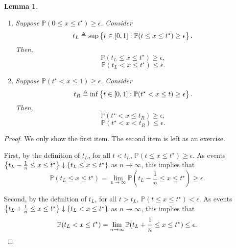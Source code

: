 \documentclass{article}
\newtheorem{lemma}{Lemma}
\newcommand{\PP}{\mathbb{P}}
\newcommand{\defeq}{\triangleq}
\begin{document}
\begin{lemma}
\begin{enumerate}
\item Suppose $\PP(0 \leq x \leq t^\star) \geq \epsilon$. Consider
\[ t_L \defeq \sup\cbr{t \in [0,1]: \PP(t \leq x \leq t^\star) \geq \epsilon}. \]
Then,
\[ \PP(t_L \leq x \leq t^\star) \geq \epsilon, \]
\[ \PP(t_L < x \leq t^\star) \leq \epsilon. \]

\item Suppose $\PP(t^\star < x \leq 1) \geq \epsilon$.
Consider
\[ t_R \defeq \inf\cbr{t \in [0,1]: \PP(t^\star < x \leq t) \geq \epsilon}. \]
Then,
\[ \PP(t^\star < x \leq t_R) \geq \epsilon, \]
\[ \PP(t^\star < x < t_R) \leq \epsilon. \]
\end{enumerate}
\label{lem:discont}
\end{lemma}
\begin{proof}
We only show the first item. The second item is left as an exercise.

First, by the definition of $t_L$, for all $t < t_L$,
$\PP(t \leq x \leq t^\star) \geq \epsilon$. As events
$\cbr{t_L - \frac{1}{n} \leq x \leq t^\star} \downarrow \cbr{t_L \leq x \leq t^\star}$ as $n \to \infty$,
this implies that
\[ \PP(t_L \leq x \leq t^\star) = \lim_{n \to \infty} \PP(t_L - \frac{1}{n} \leq x \leq t^\star) \geq \epsilon. \]

Second, by the definition of $t_L$, for all $t > t_L$,
$\PP(t \leq x \leq t^\star) < \epsilon$. As events
$\cbr{t_L + \frac{1}{n} \leq x \leq t^\star} \downarrow \cbr{t_L < x \leq t^\star}$ as $n \to \infty$,
this implies that
\[ \PP(t_L < x \leq t^\star) = \lim_{n \to \infty} \PP(t_L + \frac{1}{n} \leq x \leq t^\star) \leq \epsilon. \qedhere \]
\end{proof}
\end{document}
